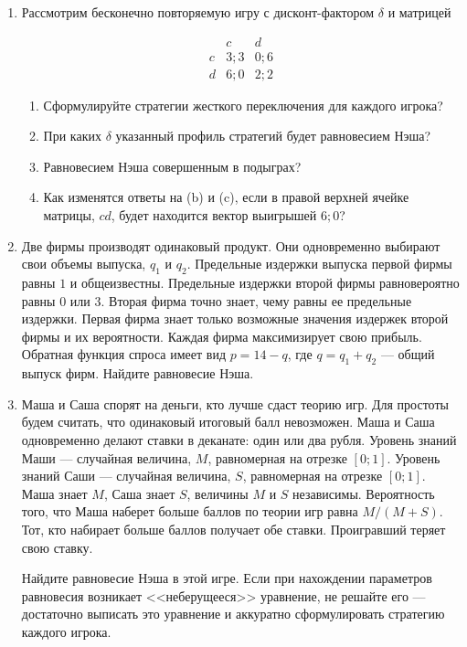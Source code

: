 \documentclass[pdftex,12pt,a4paper]{article}
\begin{document}
\begin{enumerate}
\item Рассмотрим бесконечно повторяемую игру с дисконт-фактором $\delta$ и матрицей

\begin{equation}
\begin{array}{c|cc}
 & c & d \\ 
\hline
c & 3;3 & 0;6 \\ 
d & 6;0 & 2;2
\end{array} 
\end{equation}

\begin{enumerate}
\item Сформулируйте стратегии жесткого переключения для каждого игрока?
\item При каких $\delta$ указанный профиль стратегий будет равновесием Нэша?
\item Равновесием Нэша совершенным в подыграх?
\item Как изменятся ответы на (b) и (c), если в правой верхней ячейке матрицы, $cd$, будет находится вектор выигрышей $6;0$?
\end{enumerate}


\item Две фирмы производят одинаковый продукт. Они одновременно выбирают свои объемы выпуска, $q_1$ и $q_2$. Предельные издержки выпуска первой фирмы равны $1$ и общеизвестны. Предельные издержки второй фирмы равновероятно равны $0$ или $3$. Вторая фирма точно знает, чему равны ее предельные издержки. Первая фирма знает только возможные значения издержек второй фирмы и их вероятности. Каждая фирма максимизирует свою прибыль. Обратная функция спроса имеет вид $p=14-q$, где $q=q_1+q_2$ --- общий выпуск фирм. Найдите равновесие Нэша.

\item Маша и Саша спорят на деньги, кто лучше сдаст теорию игр. Для простоты будем считать, что одинаковый итоговый балл невозможен. Маша и Саша одновременно делают ставки в деканате: один или два рубля. Уровень знаний Маши --- случайная величина, $M$, равномерная на отрезке $[0;1]$. Уровень знаний Саши --- случайная величина, $S$, равномерная на отрезке $[0;1]$. Маша знает $M$, Саша знает $S$, величины $M$ и $S$ независимы. Вероятность того, что Маша наберет больше баллов по теории игр равна $M/(M+S)$. Тот, кто набирает больше баллов получает обе ставки. Проигравший теряет свою ставку. 

Найдите равновесие Нэша в этой игре. Если при нахождении параметров равновесия возникает <<неберущееся>> уравнение, не решайте его --- достаточно выписать это уравнение и аккуратно сформулировать стратегию каждого игрока.


\end{enumerate}
\end{document}
